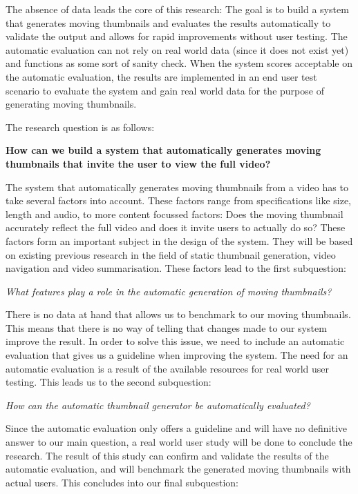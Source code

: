 \documentclass{../resources/acm_proc_article-sp}
\begin{document}
The absence of data leads the core of this research: The goal is to build a system that generates moving thumbnails and evaluates the results automatically to validate the output and allows for rapid improvements without user testing. The automatic evaluation can not rely on real world data (since it does not exist yet) and functions as some sort of sanity check. When the system scores acceptable on the automatic evaluation, the results are implemented in an end user test scenario to evaluate the system and gain real world data for the purpose of generating moving thumbnails.

The research question is as follows:

\textbf{How can we build a system that automatically generates moving thumbnails that invite the user to view the full video?}

The system that automatically generates moving thumbnails from a video has to take several factors into account. These factors range from specifications like size, length and audio, to more content focussed factors: Does the moving thumbnail accurately reflect the full video and does it invite users to actually do so? These factors form an important subject in the design of the system. They will be based on existing previous research in the field of static thumbnail generation, video navigation and video summarisation. These factors lead to the first subquestion:

\textit{What features play a role in the automatic generation of moving thumbnails?}

There is no data at hand that allows us to benchmark to our moving thumbnails. This means that there is no way of telling that changes made to our system improve the result. In order to solve this issue, we need to include an automatic evaluation that gives us a guideline when improving the system. The need for an automatic evaluation is a result of the available resources for real world user testing. This leads us to the second subquestion:

\textit{How can the automatic thumbnail generator be automatically evaluated?}

Since the automatic evaluation only offers a guideline and will have no definitive answer to our main question, a real world user study will be done to conclude the research. The result of this study can confirm and validate the results of the automatic evaluation, and will benchmark the generated moving thumbnails with actual users. This concludes into our final subquestion:
\end{document}
